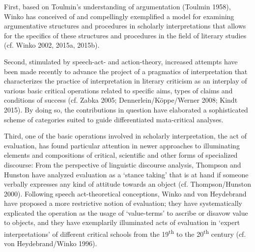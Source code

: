 First, based on Toulmin's understanding of argumentation (Toulmin 1958), Winko has conceived of and compellingly exemplified a model for examining argumentative structures and procedures in scholarly interpretations that allows for the specifics of these structures and procedures in the field of literary studies (cf. Winko 2002, 2015a, 2015b). 

Second, stimulated by speech-act- and action-theory, increased attempts have been made recently to advance the project of a pragmatics of interpretation that characterizes the
practice of interpretation in literary criticism as an interplay of various basic critical operations related to specific aims, types of claims and conditions of success (cf. Zabka 2005;
Dennerlein/K\"oppe/Werner 2008; Kindt 2015). By doing so, the contributions in question have elaborated a sophisticated scheme of categories suited to guide differentiated mata-critical analyses. 

Third, one of the basic operations involved in scholarly interpretation, the act of evaluation, has found particular attention in newer approaches to illuminating elements and compositions of critical, scientific and other forms of specialized discourse: From the perspective of linguistic discourse analysis, Thompson and Hunston have analyzed evaluation as a `stance taking' that is at hand if someone verbally expresses any kind of attitude towards an object (cf. Thompson/Hunston 2000). Following speech act-theoretical conceptions, Winko and von Heydebrand have proposed a more restrictive notion of evaluation; they have systematically explicated the operation as the usage of `value-terms' to ascribe or disavow value to objects, and they have exemplarily illuminated acts of evaluation in `expert interpretations' of different critical schools from the 19\textsuperscript{th} to the 20\textsuperscript{th} century (cf. von Heydebrand/Winko 1996).
